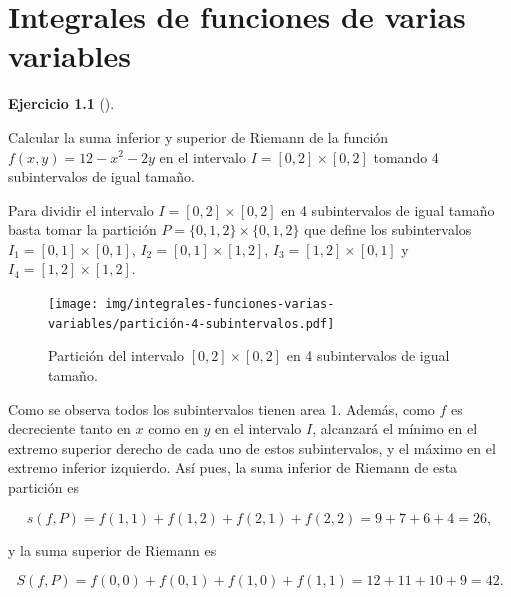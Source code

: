 \documentclass[
  a4paper,
]{scrreport}
\theoremstyle{definition}
\newtheorem{exercise}{Ejercicio}[chapter]
\theoremstyle{remark}
\begin{document}

\chapter{Integrales de funciones de varias
variables}\label{integrales-de-funciones-de-varias-variables}

\begin{exercise}[]\protect\hypertarget{exr-sumas-riemann-n-dimensional}{}\label{exr-sumas-riemann-n-dimensional}

Calcular la suma inferior y superior de Riemann de la función
\(f(x,y)=12-x^2-2y\) en el intervalo \(I=[0,2]\times[0,2]\) tomando
\(4\) subintervalos de igual tamaño.

\end{exercise}

\begin{tcolorbox}[enhanced jigsaw, left=2mm, coltitle=black, colbacktitle=quarto-callout-tip-color!10!white, opacitybacktitle=0.6, colback=white, breakable, titlerule=0mm, toptitle=1mm, rightrule=.15mm, bottomtitle=1mm, bottomrule=.15mm, toprule=.15mm, leftrule=.75mm, arc=.35mm, opacityback=0, title=\textcolor{quarto-callout-tip-color}{\faLightbulb}\hspace{0.5em}{Solución}, colframe=quarto-callout-tip-color-frame]

Para dividir el intervalo \(I=[0,2]\times[0,2]\) en 4 subintervalos de
igual tamaño basta tomar la partición \(P=\{0,1,2\}\times\{0,1,2\}\) que
define los subintervalos \(I_1=[0,1]\times [0,1]\),
\(I_2=[0,1]\times [1,2]\), \(I_3=[1,2]\times [0,1]\) y
\(I_4=[1,2]\times [1,2]\).

\begin{figure}[H]

{\centering \texttt{[image: img/integrales-funciones-varias-variables/partición-4-subintervalos.pdf]}

}

\caption{Partición del intervalo \([0,2]\times [0,2]\) en 4
subintervalos de igual tamaño.}

\end{figure}%

Como se observa todos los subintervalos tienen area 1. Además, como
\(f\) es decreciente tanto en \(x\) como en \(y\) en el intervalo \(I\),
alcanzará el mínimo en el extremo superior derecho de cada uno de estos
subintervalos, y el máximo en el extremo inferior izquierdo. Así pues,
la suma inferior de Riemann de esta partición es

\[
s(f,P) 
= f(1,1) + f(1,2) + f(2,1) + f(2,2)
= 9 + 7 + 6 + 4
= 26,
\]

y la suma superior de Riemann es

\[
S(f,P) 
= f(0,0) + f(0,1) + f(1,0) + f(1,1)
= 12 + 11 + 10 + 9 
= 42.
\]

\end{tcolorbox}
\end{document}
